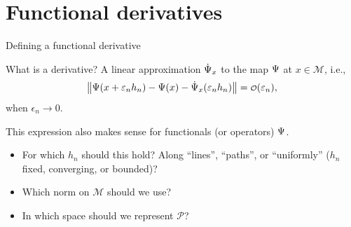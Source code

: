 \documentclass{beamer}\usepackage{listings}
\begin{document}
\section{Functional derivatives}
\label{sec:orge61e27a}
\begin{frame}[label={sec:org43eff4d}]{Defining a functional derivative}
\begin{block}{What is a derivative? \pause}
A linear approximation \(\dot{\operatorname{\Psi}}_x\) to the map \(\operatorname{\Psi}\) at \(x \in \mathcal{M}\), i.e.,
\begin{equation*}
  \left\Vert
    \TT(x + \epsilon_n h_n) - \TT(x) - \dot{\TT}_x(\epsilon_n h_n)
  \right\Vert = \smallO(\epsilon_n),
\end{equation*}
when \(\epsilon_n \rightarrow 0\).

\pause \hfill
\end{block}
This expression also makes sense for functionals (or operators) \(\operatorname{\Psi}\).

\pause \hfill

\begin{itemize}[<+->]
\item For which \(h_n\) should this hold? Along ``lines'', ``paths'', or ``uniformly'' (\(h_n\) fixed,
converging, or bounded)?
\item Which norm on \(\mathcal{M}\) should we use?
\item In which space should we represent \(\mathcal{P}\)?
\end{itemize}
\end{frame}
\end{document}
